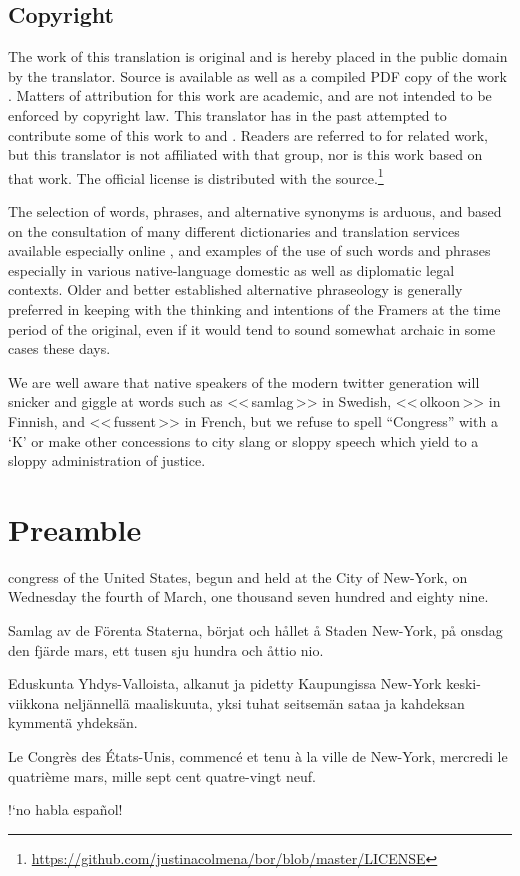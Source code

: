 \documentclass[a4paper,landscape,10pt]{article}
\newcommand{\tblock}[5]{\noindent\begin{minipage}[t]{0.18\textwidth}\foreignlanguage{english}{#1}\end{minipage}\hskip 0.025\textwidth\begin{minipage}[t]{0.18\textwidth}\foreignlanguage{swedish}{#2}\end{minipage}\hskip 0.025\textwidth\begin{minipage}[t]{0.18\textwidth}\foreignlanguage{finnish}{#3}\end{minipage}\hskip 0.025\textwidth\begin{minipage}[t]{0.18\textwidth}\foreignlanguage{french}{#4}\end{minipage}\hskip 0.025\textwidth\begin{minipage}[t]{0.18\textwidth}\foreignlanguage{spanish}{#5}\end{minipage}}
\begin{document}
\begin{multicols}{3}
\section*{Copyright}

The work of this translation is original and is hereby placed in the public domain by the translator. Source \cite{src} is available as well as a compiled PDF copy of the work \cite{doc}. Matters of attribution for this work are academic, and are not intended to be enforced by copyright law. This translator has in the past attempted to contribute some of this work to \cite{wp-bor-sv} and \cite{wp-bor-fi}. Readers are referred to \cite{jpfo-bor} for related work, but this translator is not affiliated with that group, nor is this work based on that work.  The official license is distributed with the source.\footnote{\url{https://github.com/justinacolmena/bor/blob/master/LICENSE}}

	The selection of words, phrases, and alternative synonyms is arduous, and based on the consultation of many different dictionaries and translation services available especially online \cite[etc.]{bab.la,google-translate,collins-en-fr,lexilogos-fr,free-en-fi,lexilogos-fi}, and examples of the use of such words and phrases especially in various native-language domestic as well as diplomatic legal contexts. Older and better established alternative phraseology is generally preferred in keeping with the thinking and intentions of the Framers at the time period of the original, even if it would tend to sound somewhat archaic in some cases these days.

	We are well aware that native speakers of the modern twitter generation will snicker and giggle at words such as \foreignlanguage{swedish}{<<\,samlag\,>>} in Swedish, \foreignlanguage{finnish}{<<\,olkoon\,>>} in Finnish, and \foreignlanguage{french}{<<\,fussent\,>>} in French, but we refuse to spell ``Congress'' with a `K' or make other concessions to city slang or sloppy speech which yield to a sloppy administration of justice.
\end{multicols}

\section*{Preamble}

\tblock
{\Gls{congress} of the United States, begun and held at the City of New-York, on Wednesday the fourth of March, one thousand seven hundred and eighty nine.}
{Samlag av de Förenta Staterna, börjat och hållet å Staden New-York, på onsdag den fjärde mars, ett tusen sju hundra och åttio nio.}
{Eduskunta Yhdys-Valloista, alkanut ja pidetty Kaupungissa New-York keski-viikkona neljännellä maaliskuuta, yksi tuhat seitsemän sataa ja kahdeksan kymmentä yhdeksän.}
{Le Congrès des États-Unis, commencé et tenu à la ville de New-York, mercredi le quatrième mars, mille sept cent quatre-vingt neuf.}
{!`no habla español!}
\end{document}
